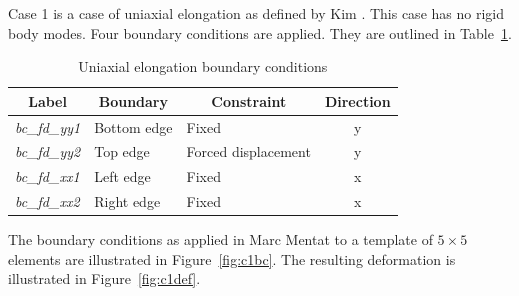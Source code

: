 Case 1 is a case of uniaxial elongation as defined by Kim \citep{Kim2015}. This case has no rigid body modes. Four boundary conditions are applied. They are outlined in Table~\ref{tab:c1}.

\begin{table}[H]
\centering
\begin{tabular}{@{}lllc@{}}
\toprule
\multicolumn{1}{c}{\textbf{Label}} & \multicolumn{1}{c}{\textbf{Boundary}} & \multicolumn{1}{c}{\textbf{Constraint}} & \textbf{Direction} \\ \midrule
\textit{bc\_fd\_yy1} & Bottom edge & Fixed               & y \\
\textit{bc\_fd\_yy2} & Top edge    & Forced displacement & y \\
\textit{bc\_fd\_xx1} & Left edge   & Fixed               & x \\
\textit{bc\_fd\_xx2} & Right edge  & Fixed               & x \\ \bottomrule
\end{tabular}
\caption[Uniaxial elongation boundary conditions]{Uniaxial elongation boundary conditions \citep{Kim2015}}
\label{tab:c1}
\end{table}

The boundary conditions as applied in Marc Mentat to a template of $5\times 5$ elements are illustrated in Figure~\ref{fig:c1bc}. The resulting deformation is illustrated in Figure~\ref{fig:c1def}.

